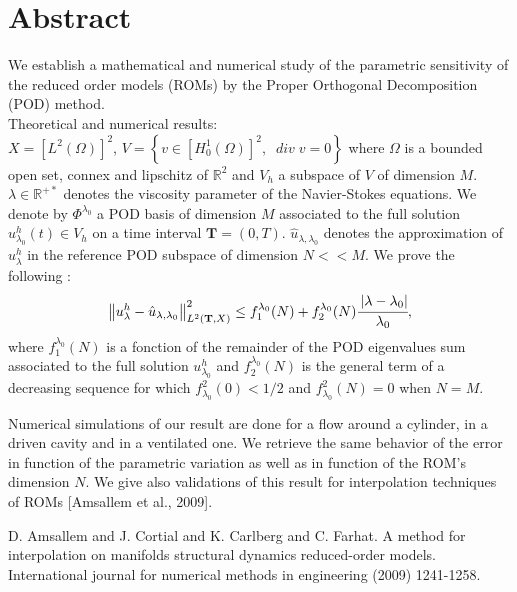 \documentclass[article, A4, 11pt]{llncs}%
\begin{document}
\section*{Abstract}
\vspace{-0.26cm}
We establish a mathematical and numerical study of the parametric sensitivity of the reduced order models (ROMs) by the Proper Orthogonal Decomposition (POD) method.\\ %
{Theoretical and numerical results:}\\
$X=[L^{2}(\Omega)]^{2}$,  $V=\left\{v\in[H^{1}_{0}(\Omega)]^{2},\;\; div\;v=0\right\}$ where $\Omega$ is a bounded open set, connex and lipschitz of $\mathbb{R}^{2}$  and $V_h$ a subspace of $V$ of dimension $M$. $\lambda\in\mathbb{R}^{+*}$ denotes the viscosity parameter of the Navier-Stokes equations. We denote by $\Phi^{\lambda_0}$ a POD basis of dimension $M$ associated to the full solution $u^{h}_{\lambda_0}(t)\in V_h$ on a time interval $\textbf{T}=(0,T)$. $\hat{u}_{\lambda,\lambda_0}$ denotes the approximation of $u^{h}_{\lambda}$ in the reference POD subspace of dimension $N<<M$. We prove the following :
$$\left\|u^{h}_{\lambda}-\hat{u}_{\lambda,\lambda_0}\right\|^{2}_{L^{2}(\textbf{T},X)}\leq f^{\lambda_0}_{1}(N)+f^{\lambda_0}_{2}(N)\cfrac{\left|\lambda-\lambda_0\right|}{\lambda_0},$$
where $f^{\lambda_0}_{1}(N)$ is a fonction of the remainder of the POD eigenvalues sum associated to the full solution $u^{h}_{\lambda_0}$ and $f^{\lambda_0}_{2}(N)$ is the general term of a decreasing sequence for which $f^{2}_{\lambda_0}(0)<1/2$ and $f^{2}_{\lambda_0}(N)=0$ when $N=M$.

Numerical simulations of our result are done for a flow around a cylinder, in a driven cavity and in a ventilated one. We retrieve the same behavior of the error in function of the parametric variation as well as in function of the ROM's dimension $N$. We give also validations of this result for interpolation techniques of ROMs [Amsallem et al., 2009].         



\begin{thebibliography}{10}
{\sc D. Amsallem and J. Cortial and K. Carlberg and C. Farhat}. {A method for interpolation on manifolds structural dynamics reduced-order models}. International journal for numerical methods in engineering (2009) 1241-1258.
\end{thebibliography} %
\end{document}
